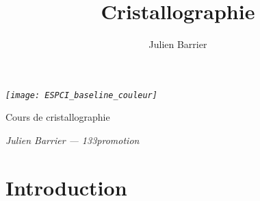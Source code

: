 \documentclass[a4paper,justified,twoside,nobib]{tufte-book}
\title{Cristallographie}
\author[Julien Barrier]{Julien Barrier}
\newcommand{\thetitle}{Cours de cristallographie}
\newcommand{\theauthor}{Julien Barrier --- 133\ieme promotion}
\newcommand{\thesubtitle}{}
\newcommand{\pc}{l'\textit{ESPCI Paris}\xspace}
\renewcommand{\=}[1]{\stackrel{#1}{=}} %
\begin{document}
\frontmatter

\thispagestyle{empty}
\begin{fullwidth}
\setlength{\parindent}{0pt}

\begin{center}\fontsize{24}{24}\selectfont\textit{\texttt{[image: ESPCI\_baseline\_couleur]}}
\end{center}

\vspace{3in}\fontsize{32.1}{54}\selectfont\thetitle

\vspace{0.125in}\fontsize{18}{18}\selectfont\thesubtitle

\vfill\fontsize{14}{14}\selectfont\textit{\theauthor}
\end{fullwidth}

\newpage


\cleardoublepage
\chapter*{Introduction}

\end{document}
